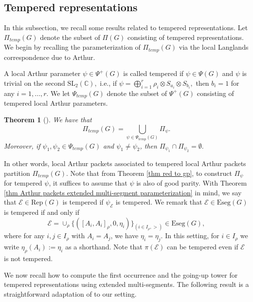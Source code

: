\documentclass[11pt,letterpaper]{amsart}
\newcommand{\Eseg}{{\mathrm{Eseg}}}
\newcommand{\Rep}{{\mathrm{Rep}}}
\newcommand{\SL}{\mathrm{SL}}
\newcommand{\BC}{\mathbb{C}}
\newcommand{\EE}{\mathcal{E}}
\newtheorem{thm}{Theorem}[section]
\numberwithin{equation}{section}
\begin{document}
\subsection{Tempered representations}

In this subsection, we recall some results related to tempered representations. Let $\Pi_{temp}(G)$ denote the subset of $\Pi(G)$ consisting of tempered representations. We begin by recalling the parameterization of $\Pi_{temp}(G)$ via the local Langlands correspondence due to Arthur.

A local Arthur parameter $\psi\in\Psi^+(G)$ is called tempered if $\psi\in\Psi(G)$ and $\psi$ is trivial on the second $\SL_2(\BC),$ i.e., if $\psi=\bigoplus_{i=1}^r \rho_i\otimes S_{a_i}\otimes S_{b_i},$ then $b_i=1$ for any $i=1,\dots,r.$ We let $\Psi_{temp}(G)$ denote the subset of $\Psi^+(G)$ consisting of tempered local Arthur parameters. 

\begin{thm}[{\cite[Theorem 1.5.1]{Art13}}]\label{thm Arthur tempered}
    We have that
    \[\Pi_{temp}(G)=\bigcup_{\psi\in\Psi_{temp}(G)} \Pi_\psi.\]
    Moreover, if $\psi_1,\psi_2\in\Psi_{temp}(G)$ and $\psi_1\neq\psi_2$, then $\Pi_{\psi_1}\cap\Pi_{\psi_2}=\emptyset.$
\end{thm}
In other words, local Arthur packets associated to tempered local Arthur packets partition  $\Pi_{temp}(G)$. Note that from Theorem \ref{thm red to gp}, to construct $\Pi_\psi$ for tempered $\psi$, it suffices to assume that $\psi$ is also of good parity.
With Theorem \ref{thm Arthur packets extended multi-segment parameterization} in mind, we say that $\EE\in\Rep(G)$ is tempered if $\psi_\EE$ is tempered. We remark that $\EE\in\Eseg(G)$ is tempered if and only if
\[
\EE=\cup_\rho\{([A_i,A_i]_\rho,0,\eta_i)\}_{(i\in I_\rho, >)}\in\Eseg(G),
\]
where for any $i,j\in I_\rho$ with $A_i=A_j$, we have $\eta_i=\eta_j$.  In this setting, for $i\in I_\rho$ we write $\eta_\rho(A_i):=\eta_i$ as a shorthand. Note that $\pi(\EE)$ can be tempered even if $\EE$ is not tempered.

We now recall how to compute the first occurrence and the going-up tower for tempered representations using extended multi-segments. The following result is a straightforward adaptation of \cite[Theorem 4.1]{AG17a} to our setting. 
\end{document}

